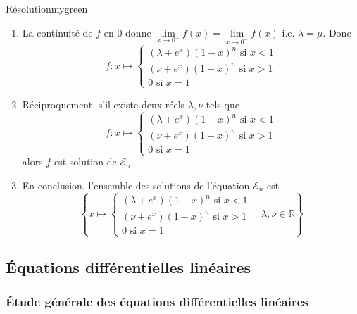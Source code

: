 \begin{demo}{Résolution}{mygreen}
\begin{enumerate}
\[\begin{array}{l}
        \end{array} \right. \]
        \item La continuité de $f$ en 0 donne $\lim\limits_{x \rightarrow 0^-} f(x) = \lim\limits_{x \rightarrow 0^+} f(x)$ i.e. $\lambda = \mu$. Donc 
        \[ f : x \mapsto \left\{ \begin{array}{l}
            (\lambda + e^x)(1-x)^n \text{ si } x < 1 \\
            (\nu + e^x)(1-x)^n \text{ si } x > 1 \\
            0 \text{ si } x = 1
        \end{array} \right. \]
        \item Réciproquement, s’il existe deux réels $\lambda,\nu$ tels que \[ f : x \mapsto \left\{ \begin{array}{l}
            (\lambda + e^x)(1-x)^n \text{ si } x < 1 \\
            (\nu + e^x)(1-x)^n \text{ si } x > 1 \\
            0 \text{ si } x = 1
        \end{array} \right. \] alors $f$ est solution de $\mathcal{E}_n$.
        \item En conclusion, l’ensemble des solutions de l’équation $\mathcal{E}_n$ est 
        \[\left\{ x \mapsto \left\{ \begin{array}{l}
            (\lambda + e^x)(1-x)^n \text{ si } x < 1 \\
            (\nu + e^x)(1-x)^n \text{ si } x > 1 \\
            0 \text{ si } x = 1 \end{array} \right. \quad \lambda, \nu \in \mathbb{R} \right\}\]
    \end{enumerate}
    \end{demo}

\subsection{Équations différentielles linéaires}

    \subsubsection{Étude générale des équations différentielles linéaires}

